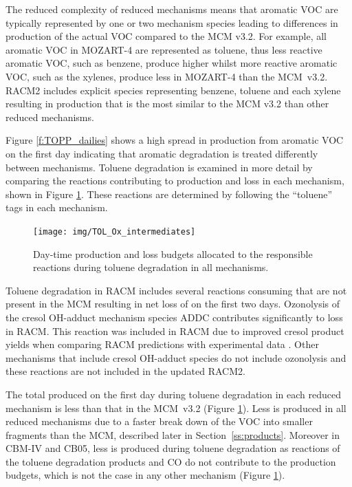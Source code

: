 The reduced complexity of reduced mechanisms means that aromatic VOC are typically represented by one or two mechanism species leading to differences in  production of the actual VOC compared to the MCM v3.2.
For example, all aromatic VOC in MOZART-4 are represented as toluene, thus less reactive aromatic VOC, such as benzene, produce higher  whilst more reactive aromatic VOC, such as the xylenes, produce less  in MOZART-4 than the \mbox{MCM v3.2}.
RACM2 includes explicit species representing benzene, toluene and each xylene resulting in  production that is the most similar to the MCM v3.2 than other reduced mechanisms.

Figure \ref{f:TOPP_dailies} shows a high spread in  production from aromatic VOC on the first day indicating that aromatic degradation is treated differently between mechanisms.
Toluene degradation is examined in more detail by comparing the reactions contributing to  production and loss in each mechanism, shown in Figure \ref{f:toluene_Ox}. 
These reactions are determined by following the ``toluene'' tags in each mechanism.

%
\begin{figure}
    \centering
    \texttt{[image: img/TOL\_Ox\_intermediates]}
    \vspace{0mm}
    \caption{Day-time  production and loss budgets allocated to the responsible reactions during toluene degradation in all mechanisms.}
    \vspace{-4mm}
    \label{f:toluene_Ox}
\end{figure}
%
Toluene degradation in RACM includes several reactions consuming  that are not present in the MCM resulting in net loss of  on the first two days.
Ozonolysis of the cresol OH-adduct mechanism species ADDC contributes significantly to  loss in RACM.
This reaction was included in RACM due to improved cresol product yields when comparing RACM predictions with experimental data \citep{Stockwell:1997}. 
Other mechanisms that include cresol OH-adduct species do not include ozonolysis and these reactions are not included in the updated RACM2.

The total  produced on the first day during toluene degradation in each reduced mechanism is less than that in the \mbox{MCM v3.2} (Figure \ref{f:toluene_Ox}).
Less  is produced in all reduced mechanisms due to a faster break down of the VOC into smaller fragments than the MCM, described later in \mbox{Section \ref{ss:products}}.
Moreover in CBM-IV and CB05, less  is produced during toluene degradation as reactions of the toluene degradation products  and CO do not contribute to the  production budgets, which is not the case in any other mechanism (Figure \ref{f:toluene_Ox}).

